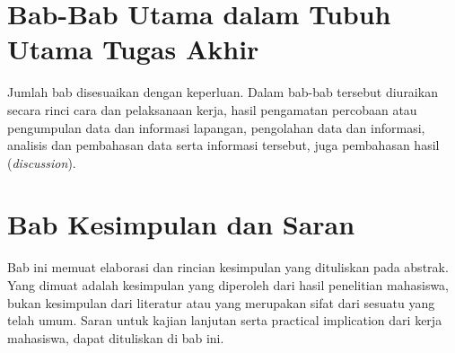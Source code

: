 \section{Bab-Bab Utama dalam Tubuh Utama Tugas Akhir}
Jumlah bab disesuaikan dengan keperluan. Dalam bab-bab tersebut diuraikan secara rinci cara dan pelaksanaan kerja, hasil pengamatan percobaan atau pengumpulan data dan informasi lapangan, pengolahan data dan informasi, analisis dan pembahasan data serta informasi tersebut, juga pembahasan hasil (\textit{discussion}).

\section{Bab Kesimpulan dan Saran}
Bab ini memuat elaborasi dan rincian kesimpulan yang dituliskan pada abstrak. Yang dimuat adalah kesimpulan yang diperoleh dari hasil penelitian mahasiswa, bukan kesimpulan dari literatur atau yang merupakan sifat dari sesuatu yang telah umum. Saran untuk kajian lanjutan serta practical implication dari kerja mahasiswa, dapat dituliskan di bab ini.